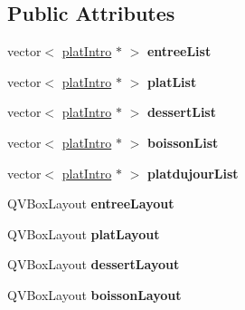 \subsection*{Public Attributes}
\begin{DoxyCompactItemize}
\item 
vector$<$ \hyperlink{classplat_intro}{plat\+Intro} $\ast$ $>$ {\bfseries entree\+List}\hypertarget{class_main_window_a3f7f02da1ccf53028290322b93fa42e2}{}\label{class_main_window_a3f7f02da1ccf53028290322b93fa42e2}

\item 
vector$<$ \hyperlink{classplat_intro}{plat\+Intro} $\ast$ $>$ {\bfseries plat\+List}\hypertarget{class_main_window_a4840e5d1f0c3aa47289d8ddc7d75e8e9}{}\label{class_main_window_a4840e5d1f0c3aa47289d8ddc7d75e8e9}

\item 
vector$<$ \hyperlink{classplat_intro}{plat\+Intro} $\ast$ $>$ {\bfseries dessert\+List}\hypertarget{class_main_window_aab182b658b8b6721eac954b45055dd21}{}\label{class_main_window_aab182b658b8b6721eac954b45055dd21}

\item 
vector$<$ \hyperlink{classplat_intro}{plat\+Intro} $\ast$ $>$ {\bfseries boisson\+List}\hypertarget{class_main_window_a67a2cbfc9148bf8cce723fb91222176b}{}\label{class_main_window_a67a2cbfc9148bf8cce723fb91222176b}

\item 
vector$<$ \hyperlink{classplat_intro}{plat\+Intro} $\ast$ $>$ {\bfseries platdujour\+List}\hypertarget{class_main_window_ab1cc32ca63523bb135bc8227ad15574f}{}\label{class_main_window_ab1cc32ca63523bb135bc8227ad15574f}

\item 
Q\+V\+Box\+Layout {\bfseries entree\+Layout}\hypertarget{class_main_window_a04970ac02e35af3fa86b8dbc69901039}{}\label{class_main_window_a04970ac02e35af3fa86b8dbc69901039}

\item 
Q\+V\+Box\+Layout {\bfseries plat\+Layout}\hypertarget{class_main_window_a55508e4fd01f0879c0862a8bef9b6fbc}{}\label{class_main_window_a55508e4fd01f0879c0862a8bef9b6fbc}

\item 
Q\+V\+Box\+Layout {\bfseries dessert\+Layout}\hypertarget{class_main_window_a3d4488b28806535e1213f1a51f82e3d3}{}\label{class_main_window_a3d4488b28806535e1213f1a51f82e3d3}

\item 
Q\+V\+Box\+Layout {\bfseries boisson\+Layout}\hypertarget{class_main_window_a8f01d60299861b6bed86868f18525aa7}{}\label{class_main_window_a8f01d60299861b6bed86868f18525aa7}


\end{DoxyCompactItemize}

